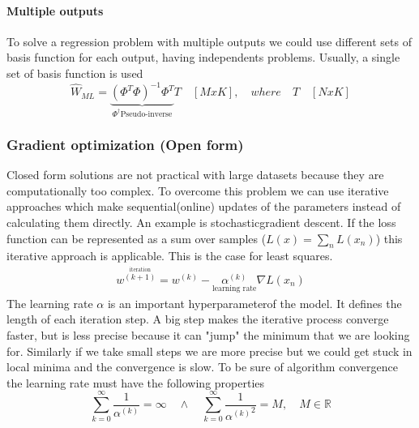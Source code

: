 \documentclass[main.tex]{subfiles}
\begin{document}
\paragraph{Multiple outputs} To solve a regression problem with multiple outputs we could use different sets of basis function for each output, having independents problems. Usually, a single set of basis function is used
\begin{equation}
    \hat{W}_{ML}=\underbrace{(\Phi^T\Phi)^{-1}\Phi^T}_{\Phi^{\dagger} \text{Pseudo-inverse}} T\quad [MxK],\quad where \quad T \quad [NxK]
\end{equation}

\subsubsection{Gradient optimization (Open form)}
Closed form solutions are not practical with large datasets because they are computationally too complex. To overcome this problem we can use iterative approaches which make sequential(online) updates of the parameters instead of calculating them directly. An example is stochastic\footnotemark gradient descent. 
If the loss function can be represented as a sum over samples ($L(x)=\sum_nL(x_n)$) this iterative approach is applicable. This is the case for least squares.
\begin{align}
    w^{\overset{\text{iteration}}{(k+1)}}=w^{(k)}-\underset{\text{learning rate}}{\alpha^{(k)}} \nabla L(x_n)
\end{align}
The learning rate $\alpha$ is an important hyperparameter\footnotemark {}of the model. It defines the length of each iteration step. A big step makes the iterative process converge faster, but is less precise because it can "jump" the minimum that we are looking for. Similarly if we take small steps we are more precise but we could get stuck in local minima and the convergence is slow. To be sure of algorithm convergence the learning rate must have the following properties
\begin{equation}
    \sum_{k=0}^{\infty}\frac{1}{\alpha^{(k)}}=\infty \quad \wedge \quad \sum_{k=0}^{\infty}\frac{1}{{\alpha^{(k)}}^2}=M, \quad M\in\mathbb{R}
\end{equation}
\end{document}
